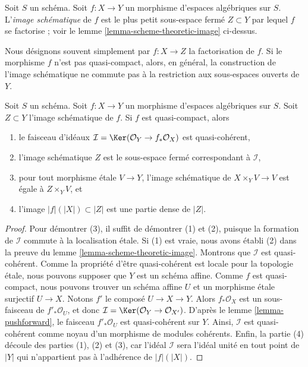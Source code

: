 \begin{definition}
\label{definition-scheme-theoretic-image}
Soit $S$ un schéma. Soit $f : X \to Y$ un morphisme d'espaces algébriques
sur $S$. L'{\it image schématique} de $f$ est le plus petit sous-espace
fermé $Z \subset Y$ par lequel $f$
se factorise ; voir le lemme \ref{lemma-scheme-theoretic-image} ci-dessus.
\end{definition}

\noindent
Nous désignons souvent simplement par $f : X \to Z$ la factorisation de $f$.
Si le morphisme $f$ n'est pas quasi-compact, alors, en général, la
construction de l'image schématique ne commute pas à la
restriction aux sous-espaces ouverts de $Y$.

\begin{lemma}
\label{lemma-quasi-compact-scheme-theoretic-image}
Soit $S$ un schéma.
Soit $f : X \to Y$ un morphisme d'espaces algébriques sur $S$.
Soit $Z \subset Y$ l'image schématique de $f$.
Si $f$ est quasi-compact, alors
\begin{enumerate}
\item le faisceau d'idéaux
$\mathcal{I} = \Ker(\mathcal{O}_Y \to f_*\mathcal{O}_X)$
est quasi-cohérent,
\item l'image schématique $Z$ est le sous-espace fermé
correspondant à $\mathcal{I}$,
\item pour tout morphisme étale $V \to Y$, l'image schématique de
$X \times_Y V \to V$ est égale à $Z \times_Y V$, et
\item l'image $|f|(|X|) \subset |Z|$ est une partie dense de $|Z|$.
\end{enumerate}
\end{lemma}

\begin{proof}
Pour démontrer (3), il suffit de démontrer (1) et (2), puisque la
formation de $\mathcal{I}$ commute à la localisation étale.
Si (1) est vraie, nous avons établi (2) dans la preuve du lemme
\ref{lemma-scheme-theoretic-image}. Montrons que $\mathcal{I}$ est quasi-cohérent.
Comme la propriété d'être quasi-cohérent est locale pour la topologie étale, nous pouvons
supposer que $Y$ est un schéma affine. Comme $f$ est quasi-compact,
nous pouvons trouver un schéma affine $U$ et un morphisme étale surjectif
$U \to X$. Notons $f'$ le composé $U \to X \to Y$.
Alors $f_*\mathcal{O}_X$ est un sous-faisceau de $f'_*\mathcal{O}_U$,
et donc $\mathcal{I} = \Ker(\mathcal{O}_Y \to \mathcal{O}_{X'})$.
D'après le lemme \ref{lemma-pushforward},
le faisceau $f'_*\mathcal{O}_U$ est quasi-cohérent sur $Y$. Ainsi, $\mathcal{I}$
est quasi-cohérent comme noyau d'un morphisme de modules cohérents.
Enfin, la partie (4) découle des parties (1), (2) et (3), car l'idéal
$\mathcal{I}$ sera l'idéal unité en tout point de $|Y|$ qui
n'appartient pas à l'adhérence de $|f|(|X|)$.
\end{proof}

